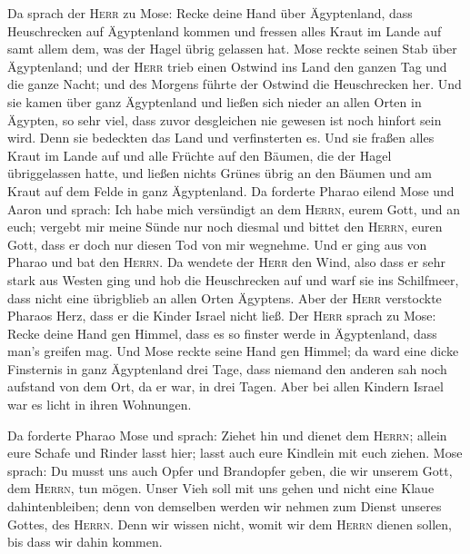  Da sprach der \textsc{Herr} zu Mose: Recke deine Hand
über Ägyptenland, dass Heuschrecken auf Ägyptenland kommen und fressen
alles Kraut im Lande auf samt allem dem, was der Hagel übrig gelassen
hat.  Mose reckte seinen Stab über Ägyptenland; und der
\textsc{Herr} trieb einen Ostwind ins Land den ganzen Tag und die ganze
Nacht; und des Morgens führte der Ostwind die Heuschrecken her.
 Und sie kamen über ganz Ägyptenland und ließen sich
nieder an allen Orten in Ägypten, so sehr viel, dass zuvor desgleichen
nie gewesen ist noch hinfort sein wird.  Denn sie
bedeckten das Land und verfinsterten es. Und sie fraßen alles Kraut im
Lande auf und alle Früchte auf den Bäumen, die der Hagel übriggelassen
hatte, und ließen nichts Grünes übrig an den Bäumen und am Kraut auf dem
Felde in ganz Ägyptenland.  Da forderte Pharao eilend
Mose und Aaron und sprach: Ich habe mich versündigt an dem
\textsc{Herrn}, eurem Gott, und an euch;  vergebt mir
meine Sünde nur noch diesmal und bittet den \textsc{Herrn}, euren Gott,
dass er doch nur diesen Tod von mir wegnehme.  Und er
ging aus von Pharao und bat den \textsc{Herrn}.  Da
wendete der \textsc{Herr} den Wind, also dass er sehr stark aus Westen
ging und hob die Heuschrecken auf und warf sie ins Schilfmeer, dass
nicht eine übrigblieb an allen Orten Ägyptens.  Aber der
\textsc{Herr} verstockte Pharaos Herz, dass er die Kinder Israel nicht
ließ.  Der \textsc{Herr} sprach zu Mose: Recke deine Hand
gen Himmel, dass es so finster werde in Ägyptenland, dass man's greifen
mag.  Und Mose reckte seine Hand gen Himmel; da ward eine
dicke Finsternis in ganz Ägyptenland drei Tage,  dass
niemand den anderen sah noch aufstand von dem Ort, da er war, in drei
Tagen. Aber bei allen Kindern Israel war es licht in ihren Wohnungen.

 Da forderte Pharao Mose und sprach: Ziehet hin und
dienet dem \textsc{Herrn}; allein eure Schafe und Rinder lasst hier;
lasst auch eure Kindlein mit euch ziehen.  Mose sprach:
Du musst uns auch Opfer und Brandopfer geben, die wir unserem Gott, dem
\textsc{Herrn}, tun mögen.  Unser Vieh soll mit uns gehen
und nicht eine Klaue dahintenbleiben; denn von demselben werden wir
nehmen zum Dienst unseres Gottes, des \textsc{Herrn}. Denn wir wissen
nicht, womit wir dem \textsc{Herrn} dienen sollen, bis dass wir dahin
kommen.

